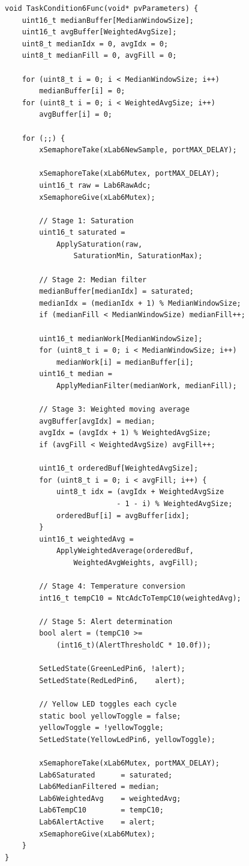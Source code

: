 \documentclass[12pt]{article}
\begin{document}
\begin{lstlisting}[caption={TaskCondition6Func --- event-driven conditioning pipeline}]
void TaskCondition6Func(void* pvParameters) {
    uint16_t medianBuffer[MedianWindowSize];
    uint16_t avgBuffer[WeightedAvgSize];
    uint8_t medianIdx = 0, avgIdx = 0;
    uint8_t medianFill = 0, avgFill = 0;

    for (uint8_t i = 0; i < MedianWindowSize; i++)
        medianBuffer[i] = 0;
    for (uint8_t i = 0; i < WeightedAvgSize; i++)
        avgBuffer[i] = 0;

    for (;;) {
        xSemaphoreTake(xLab6NewSample, portMAX_DELAY);

        xSemaphoreTake(xLab6Mutex, portMAX_DELAY);
        uint16_t raw = Lab6RawAdc;
        xSemaphoreGive(xLab6Mutex);

        // Stage 1: Saturation
        uint16_t saturated =
            ApplySaturation(raw,
                SaturationMin, SaturationMax);

        // Stage 2: Median filter
        medianBuffer[medianIdx] = saturated;
        medianIdx = (medianIdx + 1) % MedianWindowSize;
        if (medianFill < MedianWindowSize) medianFill++;

        uint16_t medianWork[MedianWindowSize];
        for (uint8_t i = 0; i < MedianWindowSize; i++)
            medianWork[i] = medianBuffer[i];
        uint16_t median =
            ApplyMedianFilter(medianWork, medianFill);

        // Stage 3: Weighted moving average
        avgBuffer[avgIdx] = median;
        avgIdx = (avgIdx + 1) % WeightedAvgSize;
        if (avgFill < WeightedAvgSize) avgFill++;

        uint16_t orderedBuf[WeightedAvgSize];
        for (uint8_t i = 0; i < avgFill; i++) {
            uint8_t idx = (avgIdx + WeightedAvgSize
                          - 1 - i) % WeightedAvgSize;
            orderedBuf[i] = avgBuffer[idx];
        }
        uint16_t weightedAvg =
            ApplyWeightedAverage(orderedBuf,
                WeightedAvgWeights, avgFill);

        // Stage 4: Temperature conversion
        int16_t tempC10 = NtcAdcToTempC10(weightedAvg);

        // Stage 5: Alert determination
        bool alert = (tempC10 >=
            (int16_t)(AlertThresholdC * 10.0f));

        SetLedState(GreenLedPin6, !alert);
        SetLedState(RedLedPin6,    alert);

        // Yellow LED toggles each cycle
        static bool yellowToggle = false;
        yellowToggle = !yellowToggle;
        SetLedState(YellowLedPin6, yellowToggle);

        xSemaphoreTake(xLab6Mutex, portMAX_DELAY);
        Lab6Saturated      = saturated;
        Lab6MedianFiltered = median;
        Lab6WeightedAvg    = weightedAvg;
        Lab6TempC10        = tempC10;
        Lab6AlertActive    = alert;
        xSemaphoreGive(xLab6Mutex);
    }
}
\end{lstlisting}
\end{document}
